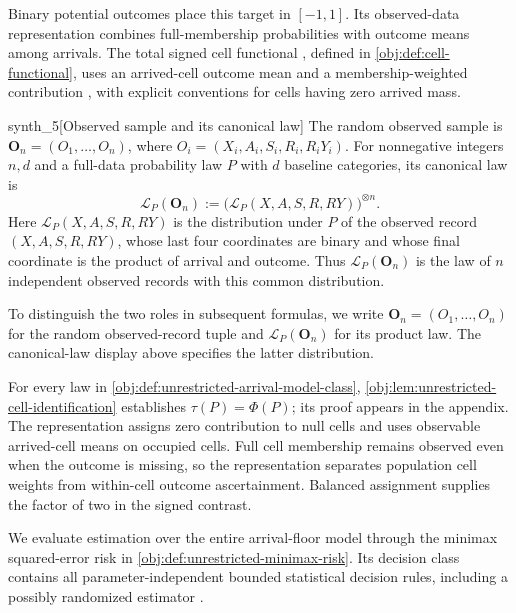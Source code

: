 \documentclass[11pt]{article}
\begin{document}
Binary potential outcomes place this target in \([-1,1]\). Its observed-data representation combines full-membership probabilities with outcome means among arrivals. The total signed cell functional , defined in \cref{obj:def:cell-functional}, uses an arrived-cell outcome mean  and a membership-weighted contribution , with explicit conventions for cells having zero arrived mass.

\begin{definitionv}{synth_5}[Observed sample and its canonical law]
The random observed sample is \(\mathbf O_n=(O_1,\ldots,O_n)\), where \(O_i=(X_i,A_i,S_i,R_i,R_iY_i)\). For nonnegative integers \(n,d\) and a full-data probability law \(P\) with \(d\) baseline categories, its canonical law is
\[
\mathcal L_P(\mathbf O_n):=\bigl(\mathcal L_P(X,A,S,R,RY)\bigr)^{\otimes n}.
\]
Here \(\mathcal L_P(X,A,S,R,RY)\) is the distribution under \(P\) of the observed record \((X,A,S,R,RY)\), whose last four coordinates are binary and whose final coordinate is the product of arrival and outcome. Thus \(\mathcal L_P(\mathbf O_n)\) is the law of \(n\) independent observed records with this common distribution.
\end{definitionv}

To distinguish the two roles in subsequent formulas, we write \(\mathbf O_n=(O_1,\ldots,O_n)\) for the random observed-record tuple and \(\mathcal L_P(\mathbf O_n)\) for its product law. The canonical-law display above specifies the latter distribution.

For every law in \cref{obj:def:unrestricted-arrival-model-class}, \cref{obj:lem:unrestricted-cell-identification} establishes \(\tau(P)=\Phi(P)\); its proof appears in the appendix. The representation assigns zero contribution to null cells and uses observable arrived-cell means on occupied cells. Full cell membership remains observed even when the outcome is missing, so the representation separates population cell weights from within-cell outcome ascertainment. Balanced assignment supplies the factor of two in the signed contrast.

We evaluate estimation over the entire arrival-floor model through the minimax squared-error risk  in \cref{obj:def:unrestricted-minimax-risk}. Its decision class  contains all parameter-independent bounded statistical decision rules, including a possibly randomized estimator .
\end{document}
